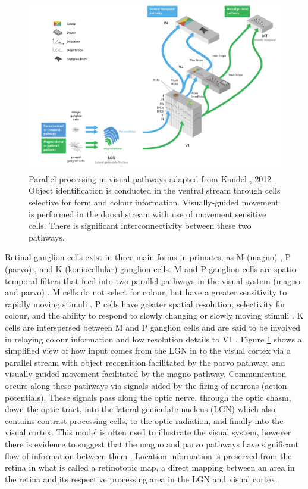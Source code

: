 \begin{figure}[h!]
\centering
\includegraphics[width=\textwidth]{images/related-work/parallel-processing-visual-pathways}
\caption{Parallel processing in visual pathways adapted from Kandel \etal, 2012 \cite{kandel2012principles}. 
Object identification is conducted in the ventral stream through cells selective for form and colour information. 
Visually-guided movement is performed in the dorsal stream with use of movement sensitive cells. 
There is significant interconnectivity between these two pathways.}
\label{fig:visual-processing}
\end{figure}


Retinal ganglion cells exist in three main forms in primates, as M (magno)-, P (parvo)-, and K (koniocellular)-ganglion cells.
M and P ganglion cells are spatio-temporal filters that feed into two parallel pathways in the visual system (magno and parvo) \cite{merigan1993parallel}.
M cells do not select for colour, but have a greater sensitivity to rapidly moving stimuli \cite{merigan1993parallel}.
P cells have greater spatial resolution, selectivity for colour, and the ability to respond to slowly changing or slowly moving stimuli \cite{merigan1993parallel}.
K cells are interspersed between M and P ganglion cells and are said to be involved in relaying colour information and low resolution details to V1 \cite{hendry2000koniocellular}.
Figure \ref{fig:visual-processing} shows a simplified view of how input comes from the LGN in to the visual cortex via a parallel stream with object recognition facilitated by the parvo pathway, and visually guided movement facilitated by the magno pathway.
Communication occurs along these pathways via signals aided by the firing of neurons (action potentials).
These signals pass along the optic nerve, through the optic chasm, down the optic tract, into the lateral geniculate nucleus (LGN) which also contains contrast processing cells, to the optic radiation, and finally into the visual cortex.
This model is often used to illustrate the visual system, however there is evidence to suggest that the magno and parvo pathways have significant flow of information between them \cite{merigan1993parallel}.
Location information is preserved from the retina in what is called a retinotopic map, a direct mapping between an area in the retina and its respective processing area in the LGN and visual cortex.


